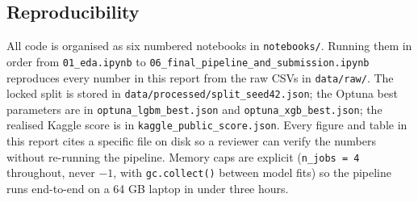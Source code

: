 \subsection{Reproducibility}

All code is organised as six numbered notebooks in \texttt{notebooks/}. Running them in order from \texttt{01\_eda.ipynb} to \texttt{06\_final\_pipeline\_and\_submission.ipynb} reproduces every number in this report from the raw CSVs in \texttt{data/raw/}. The locked split is stored in \texttt{data/processed/split\_seed42.json}; the Optuna best parameters are in \texttt{optuna\_lgbm\_best.json} and \texttt{optuna\_xgb\_best.json}; the realised Kaggle score is in \texttt{kaggle\_public\_score.json}. Every figure and table in this report cites a specific file on disk so a reviewer can verify the numbers without re-running the pipeline. Memory caps are explicit (\texttt{n\_jobs = 4} throughout, never $-1$, with \texttt{gc.collect()} between model fits) so the pipeline runs end-to-end on a 64 GB laptop in under three hours.
